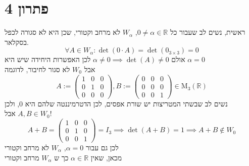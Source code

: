 \documentclass[12pt, titlepage]{article}
\begin{document}
\part*{פתרון 4}
ראשית, נשים לב שעבור כל $0\neq \alpha \in \mathbb{R}$, $W_{\alpha}$ לא מרחב וקטורי, שכן היא לא סגורה לכפל בסקלאר.
\[
    \forall A \in W_{\alpha}: \det\left(0 \cdot A \right) = \det\left( 0_{3\times 3} \right) = 0
\]
אולם $\alpha \neq 0 \implies \det\left( A \right)\neq 0$
לכן האפשרות היחידה שיש היא $\alpha = 0$\\
אבל $W_0$ לא סגור לחיבור, לדוגמה
\[
    A:=\begin{pmatrix}
        1 & 0 & 0 \\
        0 & 1 & 0 \\
        0 & 0 & 0
    \end{pmatrix},B:=\begin{pmatrix}
        0 & 0 & 0 \\
        0 & 0 & 0 \\
        0 & 0 & 1
    \end{pmatrix} \in \mathrm{M}_3\left(\mathbb{R}\right)
\]
נשים לב שבשתי המטריצות יש שורת אפסים, לכן הדטרמיננטה שלהם היא $0$, ולכן $A,B\in W_0$
אבל!
\[
    A+B = \begin{pmatrix}
        
        1 & 0 & 0 \\
        0 & 1 & 0 \\
        0 & 0 & 1
    \end{pmatrix} = I_3 \implies \det\left(A+B\right) = 1 \implies A+B \notin W_0
\]
לכן גם עבור $\alpha=0$, $W_\alpha$ לא מרחב וקטורי\\
מכאן, שאין $\alpha \in \mathbb{R}$ כך ש $W_\alpha$ מרחב וקטורי
\end{document}
